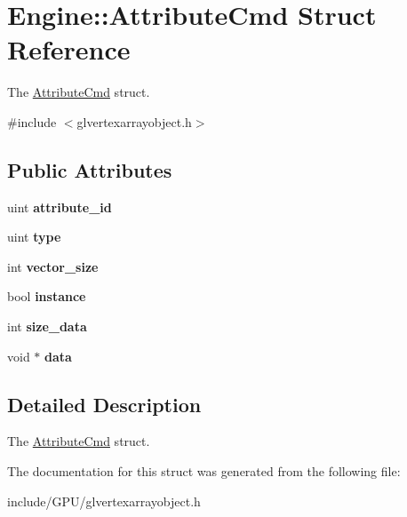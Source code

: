 \hypertarget{structEngine_1_1AttributeCmd}{}\section{Engine\+:\+:Attribute\+Cmd Struct Reference}
\label{structEngine_1_1AttributeCmd}


The \hyperlink{structEngine_1_1AttributeCmd}{Attribute\+Cmd} struct.  




{\ttfamily \#include $<$glvertexarrayobject.\+h$>$}

\subsection*{Public Attributes}
\begin{DoxyCompactItemize}
\item 
\hypertarget{structEngine_1_1AttributeCmd_a1c3a19b8ccb5ea15422ccad7b86020fd}{}uint {\bfseries attribute\+\_\+id}\label{structEngine_1_1AttributeCmd_a1c3a19b8ccb5ea15422ccad7b86020fd}

\item 
\hypertarget{structEngine_1_1AttributeCmd_a020c196f2cb4cd3a062238348dc77188}{}uint {\bfseries type}\label{structEngine_1_1AttributeCmd_a020c196f2cb4cd3a062238348dc77188}

\item 
\hypertarget{structEngine_1_1AttributeCmd_a008b36883da3a81b30fdd56c92c877e1}{}int {\bfseries vector\+\_\+size}\label{structEngine_1_1AttributeCmd_a008b36883da3a81b30fdd56c92c877e1}

\item 
\hypertarget{structEngine_1_1AttributeCmd_a287167542d08dc0e18ad4d2f7c74be89}{}bool {\bfseries instance}\label{structEngine_1_1AttributeCmd_a287167542d08dc0e18ad4d2f7c74be89}

\item 
\hypertarget{structEngine_1_1AttributeCmd_ad69c56219a081e280aaeebd31cf0e4c1}{}int {\bfseries size\+\_\+data}\label{structEngine_1_1AttributeCmd_ad69c56219a081e280aaeebd31cf0e4c1}

\item 
\hypertarget{structEngine_1_1AttributeCmd_a61bc330f61778c4dc3a24b1c4cadcb0c}{}void $\ast$ {\bfseries data}\label{structEngine_1_1AttributeCmd_a61bc330f61778c4dc3a24b1c4cadcb0c}

\end{DoxyCompactItemize}


\subsection{Detailed Description}
The \hyperlink{structEngine_1_1AttributeCmd}{Attribute\+Cmd} struct. 

The documentation for this struct was generated from the following file\+:\begin{DoxyCompactItemize}
\item 
include/\+G\+P\+U/glvertexarrayobject.\+h\end{DoxyCompactItemize}
